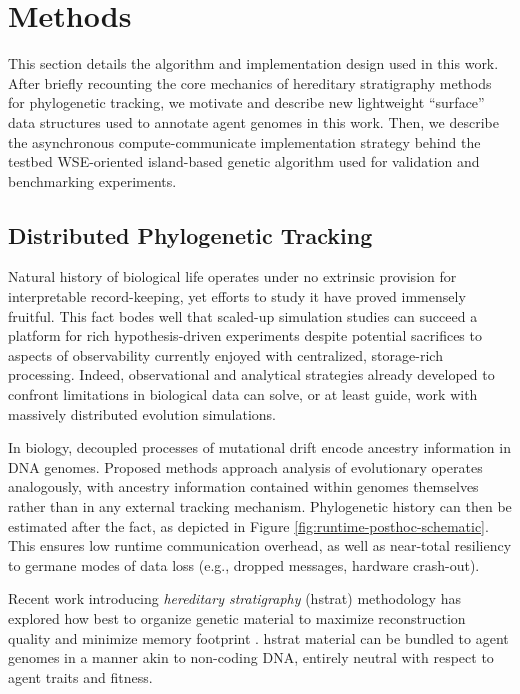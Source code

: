 \section{Methods} \label{sec:methods}

This section details the algorithm and implementation design used in this work.
After briefly recounting the core mechanics of hereditary stratigraphy methods for phylogenetic tracking, we motivate and describe new lightweight ``surface'' data structures used to annotate agent genomes in this work.
Then, we describe the asynchronous compute-communicate implementation strategy behind the testbed WSE-oriented island-based genetic algorithm used for validation and benchmarking experiments.

\subsection{Distributed Phylogenetic Tracking}

Natural history of biological life operates under no extrinsic provision for interpretable record-keeping, yet efforts to study it have proved immensely fruitful.
This fact bodes well that scaled-up simulation studies can succeed a platform for rich hypothesis-driven experiments despite potential sacrifices to aspects of observability currently enjoyed with centralized, storage-rich processing.
Indeed, observational and analytical strategies already developed to confront limitations in biological data can solve, or at least guide, work with massively distributed evolution simulations.

In biology, decoupled processes of mutational drift encode ancestry information in DNA genomes.
Proposed methods approach analysis of evolutionary operates analogously, with ancestry information contained within genomes themselves rather than in any external tracking mechanism.
Phylogenetic history can then be estimated after the fact, as depicted in Figure \ref{fig:runtime-posthoc-schematic}.
This ensures low runtime communication overhead, as well as near-total resiliency to germane modes of data loss (e.g., dropped messages, hardware crash-out).

Recent work introducing \textit{hereditary stratigraphy} (hstrat) methodology has explored how best to organize genetic material to maximize reconstruction quality and minimize memory footprint \citep{moreno2022hstrat, moreno2022hereditary}.
hstrat material can be bundled to agent genomes in a manner akin to non-coding DNA, entirely neutral with respect to agent traits and fitness.

